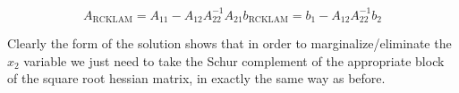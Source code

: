 \begin{subequations}
  \begin{equation}
    A_\mathrm{RCKLAM} = A_{11} - A_{12}A_{22}^{-1}A_{21}
  \end{equation}

  \begin{equation}
    b_\mathrm{RCKLAM} = b_1 - A_{12}A_{22}^{-1}b_2
  \end{equation}
  \label{RCKLAM_FINAL_EQ}
\end{subequations}

Clearly the form of the solution shows that in order to marginalize/eliminate the $x_2$ variable we just need to take the Schur complement of the appropriate block of the square root hessian matrix, in exactly the same way as before.